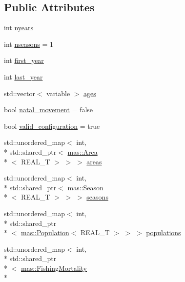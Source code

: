 \subsection*{Public Attributes}
\begin{DoxyCompactItemize}
\item 
int \hyperlink{classmas_1_1_information_aba4d8ca8604985a74a51beb13dae9d55}{nyears}
\item 
int \hyperlink{classmas_1_1_information_a454f7c72980b885c8a3f52a651435dde}{nseasons} = 1
\item 
int \hyperlink{classmas_1_1_information_a7c6cdee59338bfc38ff3cc7a4d49cdd7}{first\-\_\-year}
\item 
int \hyperlink{classmas_1_1_information_ae988a6b80c30334b911f952df97201cc}{last\-\_\-year}
\item 
std\-::vector$<$ variable $>$ \hyperlink{classmas_1_1_information_a5522e2cd2f93a0ac42574f96acd9dbcd}{ages}
\item 
bool \hyperlink{classmas_1_1_information_abfd53a611fac22190c00882c84b8c39d}{natal\-\_\-movement} = false
\item 
bool \hyperlink{classmas_1_1_information_a5205ee6cc8165f1bf1feb30c6332fbb9}{valid\-\_\-configuration} = true
\item 
std\-::unordered\-\_\-map$<$ int, \\*
std\-::shared\-\_\-ptr$<$ \hyperlink{structmas_1_1_area}{mas\-::\-Area}\\*
$<$ R\-E\-A\-L\-\_\-\-T $>$ $>$ $>$ \hyperlink{classmas_1_1_information_a1d2b80f338f3a82fa8a85cfbac2c490d}{areas}
\item 
std\-::unordered\-\_\-map$<$ int, \\*
std\-::shared\-\_\-ptr$<$ \hyperlink{structmas_1_1_season}{mas\-::\-Season}\\*
$<$ R\-E\-A\-L\-\_\-\-T $>$ $>$ $>$ \hyperlink{classmas_1_1_information_a65c0643d2ab88f4e23004aaf9565b359}{seasons}
\item 
std\-::unordered\-\_\-map$<$ int, \\*
std\-::shared\-\_\-ptr\\*
$<$ \hyperlink{classmas_1_1_population}{mas\-::\-Population}$<$ R\-E\-A\-L\-\_\-\-T $>$ $>$ $>$ \hyperlink{classmas_1_1_information_aea96825c5714a43ad531811a402d8d39}{populations}
\item 
std\-::unordered\-\_\-map$<$ int, \\*
std\-::shared\-\_\-ptr\\*
$<$ \hyperlink{structmas_1_1_fishing_mortality}{mas\-::\-Fishing\-Mortality}\\*

\end{DoxyCompactItemize}
